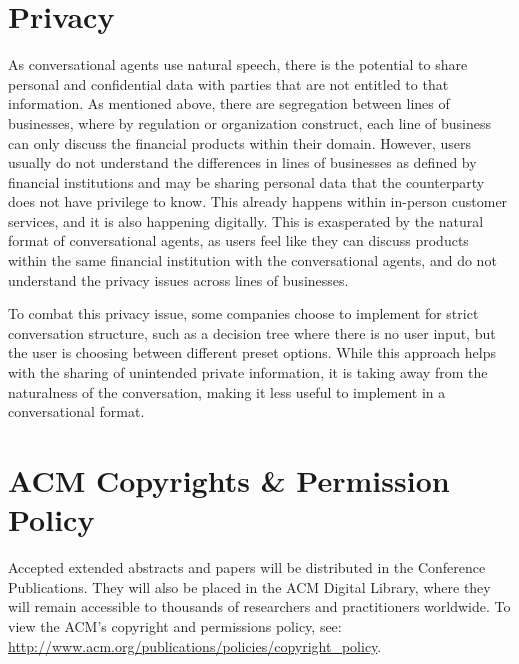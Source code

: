 \section{Privacy}


As conversational agents use natural speech, there is the potential to share personal and confidential data with parties that are not entitled to that information. As mentioned above, there are segregation between lines of businesses, where by regulation or organization construct, each line of business can only discuss the financial products within their domain. However, users usually do not understand the differences in lines of businesses as defined by financial institutions and may be sharing personal data that the counterparty does not have privilege to know. This already happens within in-person customer services, and it is also happening digitally. This is exasperated by the natural format of conversational agents, as users feel like they can discuss products within the same financial institution with the conversational agents, and do not understand the privacy issues across lines of businesses.

To combat this privacy issue, some companies choose to implement for strict conversation structure, such as a decision tree where there is no user input, but the user is choosing between different preset options. While this approach helps with the sharing of unintended private information, it is taking away from the naturalness of the conversation, making it less useful to implement in a conversational format.


\section{ACM Copyrights \& Permission Policy}
Accepted extended abstracts and papers will be distributed in the
Conference Publications. They will also be placed in the ACM Digital
Library, where they will remain accessible to thousands of researchers
and practitioners worldwide. To view the ACM's copyright and
permissions policy, see:
\url{http://www.acm.org/publications/policies/copyright_policy}.

